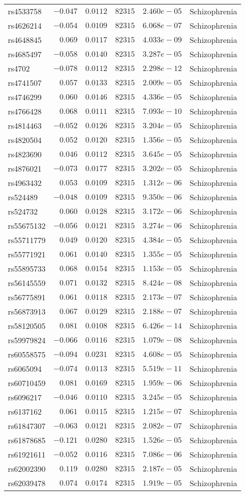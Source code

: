 \begin{tabular}{lrrrrl}
rs4533758&$-0.047$&$0.0112$&$ 82315$&$2.460e-05$&Schizophrenia\tabularnewline
rs4626214&$-0.054$&$0.0109$&$ 82315$&$6.068e-07$&Schizophrenia\tabularnewline
rs4648845&$ 0.069$&$0.0117$&$ 82315$&$4.033e-09$&Schizophrenia\tabularnewline
rs4685497&$-0.058$&$0.0140$&$ 82315$&$3.287e-05$&Schizophrenia\tabularnewline
rs4702&$-0.078$&$0.0112$&$ 82315$&$2.298e-12$&Schizophrenia\tabularnewline
rs4741507&$ 0.057$&$0.0133$&$ 82315$&$2.009e-05$&Schizophrenia\tabularnewline
rs4746299&$ 0.060$&$0.0146$&$ 82315$&$4.336e-05$&Schizophrenia\tabularnewline
rs4766428&$ 0.068$&$0.0111$&$ 82315$&$7.093e-10$&Schizophrenia\tabularnewline
rs4814463&$-0.052$&$0.0126$&$ 82315$&$3.204e-05$&Schizophrenia\tabularnewline
rs4820504&$ 0.052$&$0.0120$&$ 82315$&$1.356e-05$&Schizophrenia\tabularnewline
rs4823690&$ 0.046$&$0.0112$&$ 82315$&$3.645e-05$&Schizophrenia\tabularnewline
rs4876021&$-0.073$&$0.0177$&$ 82315$&$3.202e-05$&Schizophrenia\tabularnewline
rs4963432&$ 0.053$&$0.0109$&$ 82315$&$1.312e-06$&Schizophrenia\tabularnewline
rs524489&$-0.048$&$0.0109$&$ 82315$&$9.350e-06$&Schizophrenia\tabularnewline
rs524732&$ 0.060$&$0.0128$&$ 82315$&$3.172e-06$&Schizophrenia\tabularnewline
rs55675132&$-0.056$&$0.0121$&$ 82315$&$3.274e-06$&Schizophrenia\tabularnewline
rs55711779&$ 0.049$&$0.0120$&$ 82315$&$4.384e-05$&Schizophrenia\tabularnewline
rs55771921&$ 0.061$&$0.0140$&$ 82315$&$1.355e-05$&Schizophrenia\tabularnewline
rs55895733&$ 0.068$&$0.0154$&$ 82315$&$1.153e-05$&Schizophrenia\tabularnewline
rs56145559&$ 0.071$&$0.0132$&$ 82315$&$8.424e-08$&Schizophrenia\tabularnewline
rs56775891&$ 0.061$&$0.0118$&$ 82315$&$2.173e-07$&Schizophrenia\tabularnewline
rs56873913&$ 0.067$&$0.0129$&$ 82315$&$2.188e-07$&Schizophrenia\tabularnewline
rs58120505&$ 0.081$&$0.0108$&$ 82315$&$6.426e-14$&Schizophrenia\tabularnewline
rs59979824&$-0.066$&$0.0116$&$ 82315$&$1.079e-08$&Schizophrenia\tabularnewline
rs60558575&$-0.094$&$0.0231$&$ 82315$&$4.608e-05$&Schizophrenia\tabularnewline
rs6065094&$-0.074$&$0.0113$&$ 82315$&$5.519e-11$&Schizophrenia\tabularnewline
rs60710459&$ 0.081$&$0.0169$&$ 82315$&$1.959e-06$&Schizophrenia\tabularnewline
rs6096217&$-0.046$&$0.0110$&$ 82315$&$3.245e-05$&Schizophrenia\tabularnewline
rs6137162&$ 0.061$&$0.0115$&$ 82315$&$1.215e-07$&Schizophrenia\tabularnewline
rs61847307&$-0.063$&$0.0121$&$ 82315$&$2.082e-07$&Schizophrenia\tabularnewline
rs61878685&$-0.121$&$0.0280$&$ 82315$&$1.526e-05$&Schizophrenia\tabularnewline
rs61921611&$-0.052$&$0.0116$&$ 82315$&$7.086e-06$&Schizophrenia\tabularnewline
rs62002390&$ 0.119$&$0.0280$&$ 82315$&$2.187e-05$&Schizophrenia\tabularnewline
rs62039478&$ 0.074$&$0.0174$&$ 82315$&$1.919e-05$&Schizophrenia\tabularnewline

\end{tabular}
